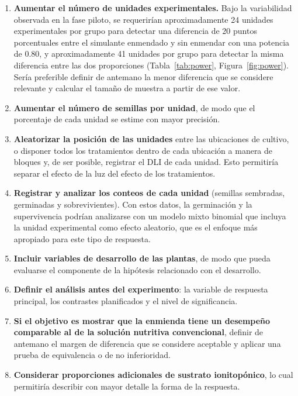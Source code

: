 \documentclass[11pt]{article}
\begin{document}
\begin{enumerate}[leftmargin=1.6em,itemsep=2pt]
\item \textbf{Aumentar el número de unidades experimentales.} Bajo la variabilidad observada en la fase piloto, se requerirían aproximadamente 24 unidades experimentales por grupo para detectar una diferencia de 20 puntos porcentuales entre el simulante enmendado y sin enmendar con una potencia de 0.80, y aproximadamente 41 unidades por grupo para detectar la misma diferencia entre las dos proporciones (Tabla~\ref{tab:power}, Figura~\ref{fig:power}). Sería preferible definir de antemano la menor diferencia que se considere relevante y calcular el tamaño de muestra a partir de ese valor.
\item \textbf{Aumentar el número de semillas por unidad}, de modo que el porcentaje de cada unidad se estime con mayor precisión.
\item \textbf{Aleatorizar la posición de las unidades} entre las ubicaciones de cultivo, o disponer todos los tratamientos dentro de cada ubicación a manera de bloques y, de ser posible, registrar el DLI de cada unidad. Esto permitiría separar el efecto de la luz del efecto de los tratamientos.
\item \textbf{Registrar y analizar los conteos de cada unidad} (semillas sembradas, germinadas y sobrevivientes). Con estos datos, la germinación y la supervivencia podrían analizarse con un modelo mixto binomial que incluya la unidad experimental como efecto aleatorio, que es el enfoque más apropiado para este tipo de respuesta.
\item \textbf{Incluir variables de desarrollo de las plantas}, de modo que pueda evaluarse el componente de la hipótesis relacionado con el desarrollo.
\item \textbf{Definir el análisis antes del experimento}: la variable de respuesta principal, los contrastes planificados y el nivel de significancia.
\item \textbf{Si el objetivo es mostrar que la enmienda tiene un desempeño comparable al de la solución nutritiva convencional}, definir de antemano el margen de diferencia que se considere aceptable y aplicar una prueba de equivalencia o de no inferioridad.
\item \textbf{Considerar proporciones adicionales de sustrato ionitopónico}, lo cual permitiría describir con mayor detalle la forma de la respuesta.
\end{enumerate}

\begin{table}[H]
\caption{\capTabI}\label{tab:power}
\end{table}
\end{document}
